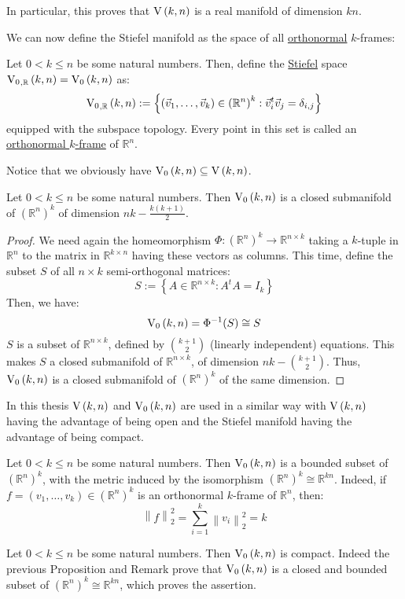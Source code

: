 \begin{remark} In particular, this proves that $\St{k}{n}$ is a real manifold of dimension $kn$.
\end{remark}

We can now define the Stiefel manifold as the space of all \ul{orthonormal} $k$-frames:
\begin{definition} Let $0<k\leq n$ be some natural numbers. Then, define the \ul{Stiefel} space $\StO{k}{n}{\mathbb{R}}=\StO{k}{n}$ as:
\[\StO{k}{n}{\mathbb{R}}:=\left\{\left(\vec{v}_1,\ldots,\vec{v}_k\right)\in{\left(\mathbb{R}^n\right)}^k:\vec{v}_i^t\vec{v}_j=\delta_{i,j}\right\}\]
equipped with the subspace topology. Every point in this set is called an \ul{orthonormal $k$-frame} of $\mathbb{R}^n$.
\end{definition}
Notice that we obviously have $\StO{k}{n}\subseteq\St{k}{n}$.

\begin{proposition}\label{prop:StO_dim_closed} Let $0<k\leq n$ be some natural numbers. Then $\StO{k}{n}$ is a closed submanifold of ${\left(\mathbb{R}^n\right)}^k$ of dimension $nk-\frac{k(k+1)}{2}$.
\end{proposition}

\begin{proof}
We need again the homeomorphism $\Phi:{\left(\mathbb{R}^n\right)}^k\to\mathbb{R}^{n\times k}$ taking a $k$-tuple in $\mathbb{R}^n$ to the matrix in $\mathbb{R}^{k\times n}$ having these vectors as columns. This time, define the subset $S$ of all $n\times k$ semi-orthogonal matrices:
\[S:=\left\{A\in\mathbb{R}^{n\times k}:A^t A=I_k\right\}\]
Then, we have:
\[\StO{k}{n}=\Phi^{-1}(S)\cong S\]
$S$ is a subset of $\mathbb{R}^{n\times k}$, defined by $\binom{k+1}{2}$ (linearly independent) equations. This makes $S$ a closed submanifold of $\mathbb{R}^{n\times k}$, of dimension $nk-\binom{k+1}{2}$. Thus, $\StO{k}{n}$ is a closed submanifold of ${\left(\mathbb{R}^n\right)}^k$ of the same dimension.
\end{proof}

In this thesis $\St{k}{n}$ and $\StO{k}{n}$ are used in a similar way with $\St{k}{n}$ having the advantage of being open and the Stiefel manifold having the advantage of being compact.
\begin{remark} Let $0<k\leq n$ be some natural numbers. Then $\StO{k}{n}$ is a bounded subset of ${\left(\mathbb{R}^n\right)}^k$, with the metric induced by the isomorphism ${\left(\mathbb{R}^n\right)}^k\cong\mathbb{R}^{kn}$. Indeed, if $f=(v_1,\ldots,v_k)\in{\left(\mathbb{R}^n\right)}^k$ is an orthonormal $k$-frame of $\mathbb{R}^n$, then:
\[\left\|f\right\|_2^2=\sum_{i=1}^k\left\|v_i\right\|_2^2=k\]
\end{remark}

\begin{lemma}\label{lem:StO_compact} Let $0<k\leq n$ be some natural numbers. Then $\StO{k}{n}$ is compact. Indeed the previous Proposition and Remark prove that $\StO{k}{n}$ is a closed and bounded subset of ${\left(\mathbb{R}^n\right)}^k\cong\mathbb{R}^{kn}$, which proves the assertion.
\end{lemma}


